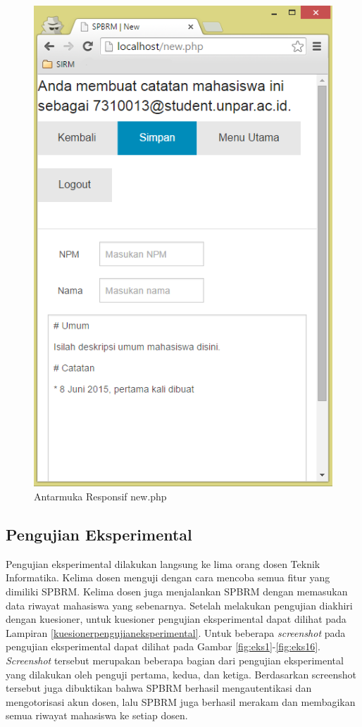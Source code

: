 \begin{figure}[H]
\centering
\includegraphics[scale=0.44]{Gambar/pengujian19.png}
\caption[Antarmuka Responsif new.php]{Antarmuka Responsif new.php} 
\label{fig:responsifnew}
\end{figure}

\subsection{Pengujian Eksperimental}
\label{sec:pengujianeksperimantal}

Pengujian eksperimental dilakukan langsung ke lima orang dosen Teknik Informatika. Kelima dosen menguji dengan cara mencoba semua fitur yang dimiliki SPBRM. Kelima dosen juga menjalankan SPBRM dengan memasukan data riwayat mahasiswa yang sebenarnya. Setelah melakukan pengujian diakhiri dengan kuesioner, untuk kuesioner pengujian eksperimental dapat dilihat pada Lampiran \ref{kuesionerpengujianeksperimental}. Untuk beberapa {\it screenshot} pada pengujian eksperimental dapat dilihat pada Gambar \ref{fig:eks1}-\ref{fig:eks16}. {\it Screenshot} tersebut merupakan beberapa bagian dari pengujian eksperimental yang dilakukan oleh penguji pertama, kedua, dan ketiga. Berdasarkan {screenshot} tersebut juga dibuktikan bahwa SPBRM berhasil mengautentikasi dan mengotorisasi akun dosen, lalu SPBRM juga berhasil merakam dan membagikan semua riwayat mahasiswa ke setiap dosen.

